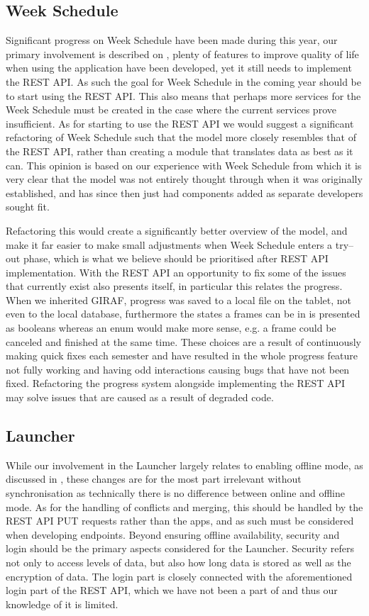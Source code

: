 \subsection*{Week Schedule}
Significant progress on Week Schedule have been made during this year, our primary involvement is described on , plenty of features to improve quality of life when using the application have been developed, yet it still needs to implement the REST API.
As such the goal for Week Schedule in the coming year should be to start using the REST API.
This also means that perhaps more services for the Week Schedule must be created in the case where the current services prove insufficient.
As for starting to use the REST API we would suggest a significant refactoring of Week Schedule such that the model more closely resembles that of the REST API, rather than creating a module that translates data as best as it can.
This opinion is based on our experience with Week Schedule from which it is very clear that the model was not entirely thought through when it was originally established, and has since then just had components added as separate developers sought fit.

Refactoring this would create a significantly better overview of the model, and make it far easier to make small adjustments when Week Schedule enters a try--out phase, which is what we believe should be prioritised after REST API implementation.
With the REST API an opportunity to fix some of the issues that currently exist also presents itself, in particular this relates the progress.
When we inherited GIRAF, progress was saved to a local file on the tablet, not even to the local database, furthermore the states a frames can be in is presented as booleans whereas an enum would make more sense, e.g. a frame could be canceled and finished at the same time.
These choices are a result of continuously making quick fixes each semester and have resulted in the whole progress feature not fully working and having odd interactions causing bugs that have not been fixed.
Refactoring the progress system alongside implementing the REST API may solve issues that are caused as a result of degraded code.

\subsection*{Launcher}
While our involvement in the Launcher largely relates to enabling offline mode, as discussed in , these changes are for the most part irrelevant without synchronisation as technically there is no difference between online and offline mode.
As for the handling of conflicts and merging, this should be handled by the REST API PUT requests rather than the apps, and as such must be considered when developing endpoints.
Beyond ensuring offline availability, security and login should be the primary aspects considered for the Launcher.
Security refers not only to access levels of data, but also how long data is stored as well as the encryption of data.
The login part is closely connected with the aforementioned login part of the REST API, which we have not been a part of and thus our knowledge of it is limited.

